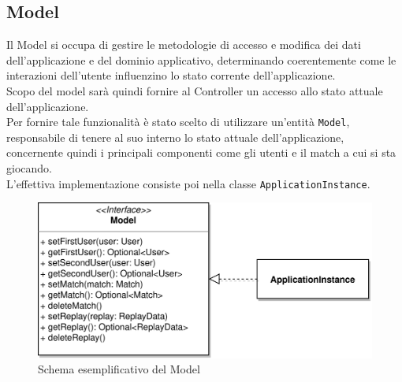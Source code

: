 \documentclass[a4paper,12pt]{report}
\begin{document}
\subsection{Model}
Il Model si occupa di gestire le metodologie di accesso e modifica dei dati dell'applicazione e del dominio applicativo, determinando coerentemente come le interazioni dell'utente influenzino lo stato corrente dell'applicazione.\\
Scopo del model sarà quindi fornire al Controller un accesso allo stato attuale dell'applicazione.
\\
Per fornire tale funzionalità è stato scelto di utilizzare un'entità \texttt{Model}, responsabile di tenere al suo interno lo stato attuale dell'applicazione, concernente quindi i principali componenti come gli utenti e il match a cui si sta giocando.
\\
L'effettiva implementazione consiste poi nella classe \texttt{ApplicationInstance}.
\begin{figure}[H]
    \begin{center}
        \centering
        \includegraphics[width=\textwidth]{img/MVC/model.png}
    \end{center}
    \caption{Schema esemplificativo del Model}
    \label{img:analysis3}
\end{figure}

\clearpage
\end{document}
